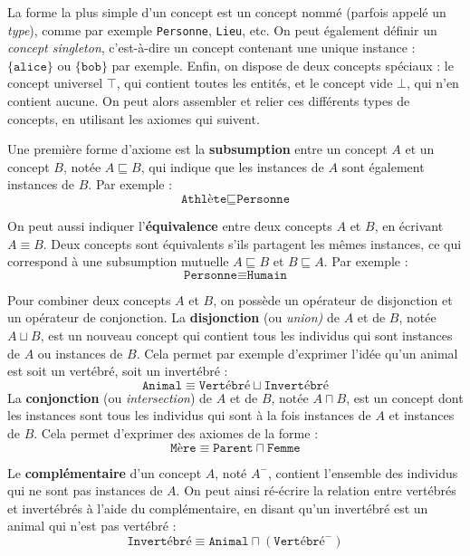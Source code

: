 La forme la plus simple d'un concept est un concept nommé (parfois appelé un \textit{type}), comme par exemple \texttt{Personne}, \texttt{Lieu}, etc. On peut également définir un \textit{concept singleton}, c'est-à-dire un concept contenant une unique instance : $\{ \texttt{alice} \}$ ou $\{ \texttt{bob} \}$ par exemple. Enfin, on dispose de deux concepts spéciaux : le concept universel $\top$, qui contient toutes les entités, et le concept vide $\bot$, qui n'en contient aucune. On peut alors assembler et relier ces différents types de concepts, en utilisant les axiomes qui suivent.

Une première forme d'axiome est la \textbf{subsumption} entre un concept $A$ et un concept $B$, notée $A \sqsubseteq B$, qui indique que les instances de $A$ sont également instances de $B$. Par exemple :
\begin{equation}
    \texttt{Athlète} \sqsubseteq \texttt{Personne}
\end{equation}

On peut aussi indiquer l'\textbf{équivalence} entre deux concepts $A$ et $B$, en écrivant $A \equiv B$. Deux concepts sont équivalents s'ils partagent les mêmes instances, ce qui correspond à une subsumption mutuelle $A \sqsubseteq B$ et $B \sqsubseteq A$. Par exemple :
\begin{equation}
    \texttt{Personne} \equiv \texttt{Humain}
\end{equation}

Pour combiner deux concepts $A$ et $B$, on possède un opérateur de disjonction et un opérateur de conjonction. La \textbf{disjonction} (ou \textit{union)} de $A$ et de $B$, notée $A \sqcup B$, est un nouveau concept qui contient tous les individus qui sont instances de $A$ ou instances de $B$. Cela permet par exemple d'exprimer l'idée qu'un animal est soit un vertébré, soit un invertébré :
\begin{equation}
    \texttt{Animal} \equiv \texttt{Vertébré} \sqcup \texttt{Invertébré}
\end{equation}
La \textbf{conjonction} (ou \textit{intersection}) de $A$ et de $B$, notée $A \sqcap B$, est un concept dont les instances sont tous les individus qui sont à la fois instances de $A$ et instances de $B$. Cela permet d'exprimer des axiomes de la forme :
\begin{equation}
    \texttt{Mère} \equiv \texttt{Parent} \sqcap \texttt{Femme}
\end{equation}

Le \textbf{complémentaire} d'un concept $A$, noté $A^-$, contient l'ensemble des individus qui ne sont pas instances de $A$. On peut ainsi ré-écrire la relation entre vertébrés et invertébrés à l'aide du complémentaire, en disant qu'un invertébré est un animal qui n'est pas vertébré :
\begin{equation}
    \texttt{Invertébré} \equiv \texttt{Animal} \sqcap (\texttt{Vertébré}^-)
\end{equation}

